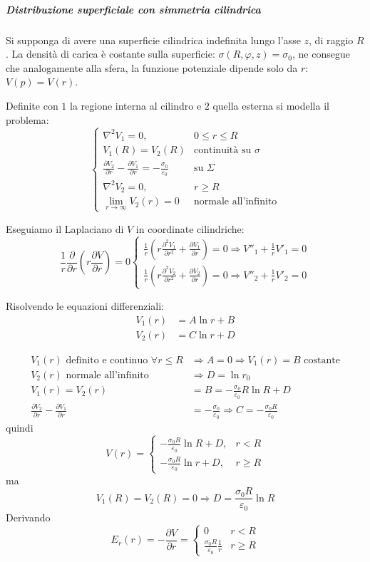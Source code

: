 \newpage
\subparagraph{Distribuzione superficiale con simmetria cilindrica}
Si supponga di avere una superficie cilindrica indefinita lungo l'asse $z$, di raggio $R$.
La densità di carica è costante sulla superficie: $\sigma(R,\varphi,z) = \sigma_0$, ne consegue che
analogamente alla sfera, la funzione potenziale dipende solo da $r$: $V(p)=V(r)$.

Definite con $1$ la regione interna al cilindro e $2$ quella esterna si modella il problema:
$$
\begin{cases}
\nabla^2 V_1 = 0, & 0\leq r\leq R\\
V_1(R) = V_2(R) & \text{continuità su }\sigma \\
\frac{\partial V_2}{\partial r} - \frac{\partial V_1}{\partial r} = -\frac{\sigma_0}{\varepsilon_0} & \text{su } \Sigma\\
\nabla^2 V_2 = 0, & r\geq R\\
\lim_{r\to \infty}V_2(r) = 0 & \text{normale all'infinito}
\end{cases}
$$

Eseguiamo il Laplaciano di $V$ in coordinate cilindriche:
$$
\frac{1}{r}\frac{\partial}{\partial r} \left(r\frac{\partial V}{\partial r}\right) = 0 \begin{cases}
\frac{1}{r}\left(r \frac{\partial^2 V_1}{\partial r^2} + 
\frac{\partial V_1}{\partial r}\right) = 0\Rightarrow V''_1 + 
\frac{1}{r}V'_1 = 0\\
\frac{1}{r}\left(r \frac{\partial^2 V_2}{\partial r^2} + 
\frac{\partial V_2}{\partial r}\right) = 0\Rightarrow V''_2 + 
\frac{1}{r}V'_2 = 0
\end{cases}
$$

Risolvendo le equazioni differenziali:
\begin{align*}
V_1(r) &= A \ln r + B\\
V_2(r) &= C \ln r + D
\end{align*}

\begin{align*}
V_1(r) \text{ definito e continuo } 
\forall r\leq R & \Rightarrow A = 0 \Rightarrow V_1(r) = B 
\text{ costante}\\
V_2(r) \text{ normale all'infinito} &\Rightarrow D = \ln r_0\\
V_1(r) = V_2(r) &= B = -\frac{\sigma_0}{\varepsilon_0}R\ln R + D\\
\frac{\partial V_2}{\partial r} - \frac{\partial V_1}{\partial r} &= -\frac{\sigma_0}{\varepsilon_0}
\Rightarrow C = -\frac{\sigma_0 R}{\varepsilon_0}
\end{align*}
quindi
$$
V(r) = \begin{cases}
-\frac{\sigma_0 R}{\varepsilon_0} \ln R + D,& r < R\\
-\frac{\sigma_0 R}{\varepsilon_0} \ln r + D,& r \geq R
\end{cases}
$$
ma
$$
V_1(R) = V_2(R) = 0\Rightarrow D = \frac{\sigma_0 R}{\varepsilon_0} \ln R
$$
Derivando
$$
E_r (r) = -\frac{\partial V}{\partial r} = \begin{cases}
0 & r < R\\
\frac{\sigma_0 R}{\varepsilon_0}\frac{1}{r}& r\geq R
\end{cases}
$$

